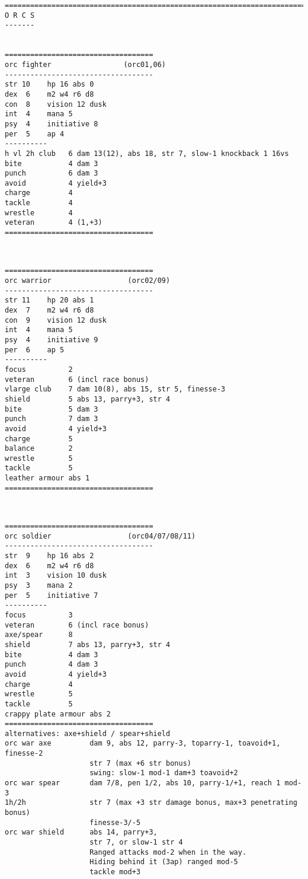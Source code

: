 \goodbreak \begin{samepage} \small \begin{verbatim}
================================================================================
O R C S
-------


===================================
orc fighter                 (orc01,06)
-----------------------------------
str 10    hp 16 abs 0
dex  6    m2 w4 r6 d8
con  8    vision 12 dusk
int  4    mana 5
psy  4    initiative 8
per  5    ap 4
----------
h vl 2h club   6 dam 13(12), abs 18, str 7, slow-1 knockback 1 16vs
bite           4 dam 3
punch          6 dam 3
avoid          4 yield+3
charge         4
tackle         4
wrestle        4
veteran        4 (1,+3)
===================================
\end{verbatim} \normalsize \end{samepage}

\

\goodbreak \begin{samepage} \small \begin{verbatim}
===================================
orc warrior                  (orc02/09)
-----------------------------------
str 11    hp 20 abs 1
dex  7    m2 w4 r6 d8
con  9    vision 12 dusk
int  4    mana 5
psy  4    initiative 9
per  6    ap 5
----------
focus          2
veteran        6 (incl race bonus)
vlarge club    7 dam 10(8), abs 15, str 5, finesse-3
shield         5 abs 13, parry+3, str 4
bite           5 dam 3
punch          7 dam 3
avoid          4 yield+3
charge         5
balance        2
wrestle        5
tackle         5
leather armour abs 1
===================================
\end{verbatim} \normalsize \end{samepage}

\

\goodbreak \begin{samepage} \small \begin{verbatim}
===================================
orc soldier                  (orc04/07/08/11)
-----------------------------------
str  9    hp 16 abs 2
dex  6    m2 w4 r6 d8
int  3    vision 10 dusk
psy  3    mana 2
per  5    initiative 7
----------
focus          3
veteran        6 (incl race bonus)
axe/spear      8
shield         7 abs 13, parry+3, str 4
bite           4 dam 3
punch          4 dam 3
avoid          4 yield+3
charge         4
wrestle        5
tackle         5
crappy plate armour abs 2
===================================
alternatives: axe+shield / spear+shield
orc war axe         dam 9, abs 12, parry-3, toparry-1, toavoid+1, finesse-2
                    str 7 (max +6 str bonus)
                    swing: slow-1 mod-1 dam+3 toavoid+2
orc war spear       dam 7/8, pen 1/2, abs 10, parry-1/+1, reach 1 mod-3
1h/2h               str 7 (max +3 str damage bonus, max+3 penetrating bonus)
                    finesse-3/-5
orc war shield      abs 14, parry+3,
                    str 7, or slow-1 str 4
                    Ranged attacks mod-2 when in the way.
                    Hiding behind it (3ap) ranged mod-5
                    tackle mod+3
\end{verbatim} \normalsize \end{samepage}

